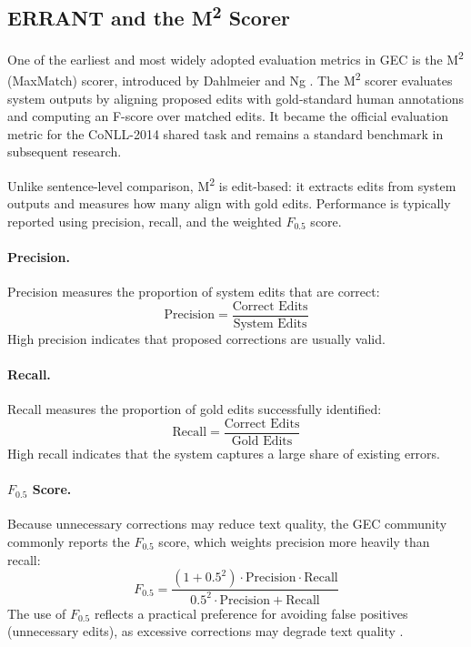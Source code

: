 \subsection{ERRANT and the M\textsuperscript{2} Scorer}

One of the earliest and most widely adopted evaluation metrics in GEC is the M\textsuperscript{2} (MaxMatch) scorer, introduced by Dahlmeier and Ng \cite{dahlmeier-ng-2012-better}. The M\textsuperscript{2} scorer evaluates system outputs by aligning proposed edits with gold-standard human annotations and computing an F-score over matched edits. It became the official evaluation metric for the CoNLL-2014 shared task \cite{ng-etal-2014-conll} and remains a standard benchmark in subsequent research.

Unlike sentence-level comparison, M\textsuperscript{2} is edit-based: it extracts edits from system outputs and measures how many align with gold edits. Performance is typically reported using precision, recall, and the weighted $F_{0.5}$ score.

\paragraph{Precision.}
Precision measures the proportion of system edits that are correct:
\[
\text{Precision} = \frac{\text{Correct Edits}}{\text{System Edits}}
\]
High precision indicates that proposed corrections are usually valid.

\paragraph{Recall.}
Recall measures the proportion of gold edits successfully identified:
\[
\text{Recall} = \frac{\text{Correct Edits}}{\text{Gold Edits}}
\]
High recall indicates that the system captures a large share of existing errors.

\paragraph{$F_{0.5}$ Score.}
Because unnecessary corrections may reduce text quality, the GEC community commonly reports the $F_{0.5}$ score, which weights precision more heavily than recall:
\[
F_{0.5} =
\frac{(1 + 0.5^2)\cdot \text{Precision} \cdot \text{Recall}}
{0.5^2 \cdot \text{Precision} + \text{Recall}}
\]
The use of $F_{0.5}$ reflects a practical preference for avoiding false positives (unnecessary edits), as excessive corrections may degrade text quality \cite{ng-etal-2014-conll}.

